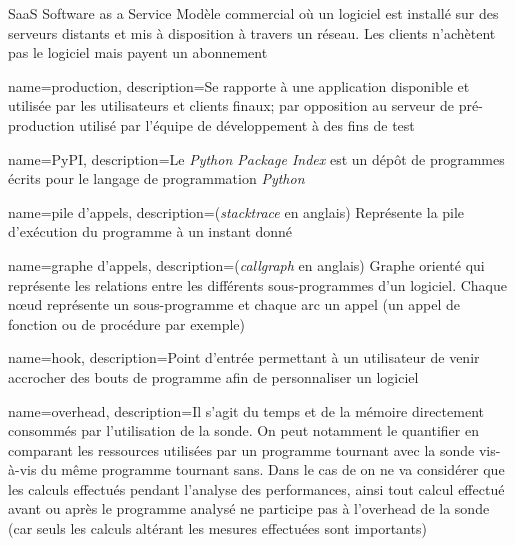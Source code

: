 \usepackage{xparse}
 {
}

  {SaaS}            %
  {Software as a Service}  %
  {Modèle commercial o\`u un logiciel est installé sur des serveurs distants et mis à disposition à travers un réseau. Les clients n'achètent pas le logiciel mais payent un abonnement} %

{
  name=production,
  description=Se rapporte à une application disponible et utilisée par les utilisateurs et clients finaux; par opposition au serveur de pré-production utilisé	 par l'équipe de développement à des fins de test
}

{
  name=PyPI,
  description=Le \emph{Python Package Index} est un dépôt de programmes écrits pour le langage de programmation \emph{Python}
}

{
  name=pile d'appels,
  description={(\emph{stacktrace} en anglais) Représente la pile d'exécution du programme à un instant donné}
}

{
  name=graphe d'appels,
  description={(\emph{callgraph} en anglais) Graphe orienté qui représente les relations entre les différents sous-programmes d'un logiciel. Chaque nœud représente un sous-programme et chaque arc un appel (un appel de fonction ou de procédure par exemple)}
}

{
  name=hook,
  description=Point d'entrée permettant à un utilisateur de venir accrocher des bouts de programme afin de personnaliser un logiciel
}

{
  name=overhead,
  description={Il s'agit du temps et de la mémoire directement consommés par l'utilisation de la sonde. On peut notamment le quantifier en comparant les ressources utilisées par un programme tournant avec la sonde vis-à-vis du même programme tournant sans. Dans le cas de \Blackfire on ne va considérer que les calculs effectués pendant l'analyse des performances, ainsi tout calcul effectué avant ou après le programme analysé ne participe pas à l'overhead de la sonde (car seuls les calculs altérant les mesures effectuées sont importants)}
}

